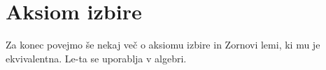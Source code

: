 













\section{Aksiom izbire}

Za konec povejmo še nekaj več o aksiomu izbire in Zornovi lemi, ki mu je ekvivalentna. Le-ta se uporablja v algebri.

